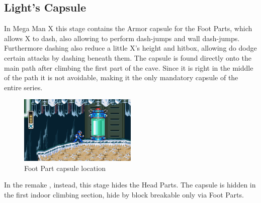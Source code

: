 \subsection{Light's Capsule}\label{X:Foot_Parts}
In Mega Man X this stage contains the Armor capsule for the Foot Parts, which allows X to dash, also allowing to perform dash-jumps and wall dash-jumps. Furthermore dashing also reduce a little X's height and hitbox, allowing do dodge certain attacks by dashing beneath them. The capsule is found directly onto the main path after climbing the first part of the cave. Since it is right in the middle of the path it is not avoidable, making it the only mandatory capsule of the entire series.
\begin{figure}[htp]
	\centering
	\includegraphics[width=0.5\textwidth]{figures/X1/Chill_penguin/Armor_foot.jpg}
	\caption{Foot Part capsule location}
\end{figure}

In the remake \mhx, instead, this stage hides the Head Parts. The capsule is hidden in the first indoor climbing section, hide by block breakable only via Foot Parts.
